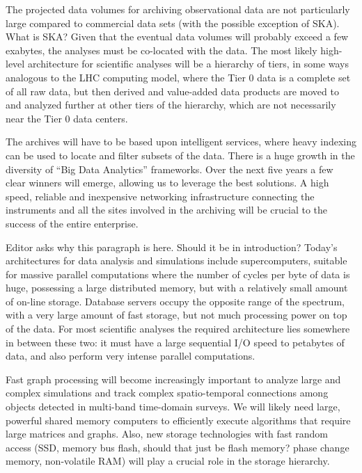 The projected
data volumes for archiving observational data 
are not particularly large compared to
commercial data sets (with the possible exception of SKA). 
{\color{red} What is SKA?}
Given that
the eventual data volumes will probably exceed a few exabytes, the
analyses must be co-located with the data.
The most likely high-level architecture for scientific analyses will
be a hierarchy of tiers, in some ways analogous to the LHC computing
model, where the Tier 0 data is a complete set of all raw data,
but then derived and value-added data products are moved to and analyzed
further at other tiers of the hierarchy, which are not necessarily
near
the Tier 0 data centers.

The archives will have to be based upon intelligent services, where
heavy indexing can be used to locate and filter subsets of the
data. 
There is a huge growth in the diversity of ``Big Data
Analytics'' frameworks.
Over the next five years a
few clear winners will emerge, allowing us to
leverage the best solutions. A high speed, reliable and
inexpensive networking infrastructure connecting the instruments and
all the sites involved in the archiving will be crucial to the success
of the entire enterprise.

{\color{red} Editor asks why this paragraph is here.  Should it be in introduction?}
Today's architectures for data analysis and simulations include
supercomputers, suitable for massive parallel computations where the
number of cycles per byte of data is huge, possessing a large
distributed memory, but with a relatively small amount of on-line
storage. Database servers occupy the opposite range of the spectrum,
with a very large amount of fast storage, but not much processing
power on top of the data. For most scientific analyses the required
architecture lies somewhere in between these two: it must have a large
sequential I/O speed to petabytes of data, and also perform very
intense parallel computations. 

Fast graph processing will become increasingly important to analyze large
and complex simulations
and track complex
spatio-temporal connections among objects detected in multi-band
time-domain surveys. 
We will likely need large, powerful shared memory computers to efficiently
execute algorithms that require large matrices and graphs.
Also, new storage technologies with
fast random access (SSD, memory bus flash, {\color{red} should that just be
flash memory?}  phase change memory, 
non-volatile RAM) will play a crucial role in the storage hierarchy.

